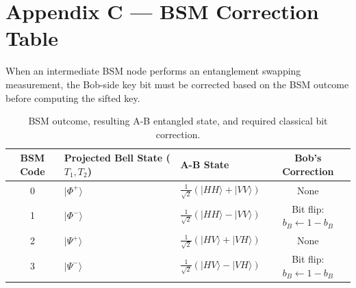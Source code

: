 \documentclass[12pt,oneside,letterpaper,english]{article}
\begin{document}
\section{Appendix C --- BSM Correction Table}
\label{app:bsm}

When an intermediate BSM node performs an entanglement swapping measurement, the Bob-side key bit must be corrected based on the BSM outcome before computing the sifted key.

\begin{table}[h!]
\centering
\caption{BSM outcome, resulting A-B entangled state, and required classical bit correction.}
\label{tab:bsm_corrections}
\begin{tabular}{cllc}
\toprule
\textbf{BSM Code} & \textbf{Projected Bell State ($T_1, T_2$)} & \textbf{A-B State} & \textbf{Bob's Correction} \\
\midrule
0 & $|\Phi^+\rangle$ & $\frac{1}{\sqrt{2}}(|HH\rangle + |VV\rangle)$ & None \\
1 & $|\Phi^-\rangle$ & $\frac{1}{\sqrt{2}}(|HH\rangle - |VV\rangle)$ & Bit flip: $b_B \leftarrow 1 - b_B$ \\
2 & $|\Psi^+\rangle$ & $\frac{1}{\sqrt{2}}(|HV\rangle + |VH\rangle)$ & None \\
3 & $|\Psi^-\rangle$ & $\frac{1}{\sqrt{2}}(|HV\rangle - |VH\rangle)$ & Bit flip: $b_B \leftarrow 1 - b_B$ \\
\bottomrule
\end{tabular}
\end{table}
\end{document}

